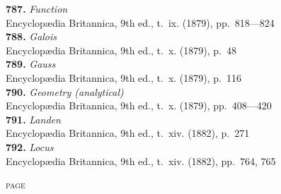 \documentclass[12pt,a4paper,oneside]{book}
\begin{document}
\textbf{787.} \textit{Function} \\
\hspace*{2em}Encyclop\ae{}dia Britannica, 9th ed., t.~ix. (1879), pp.~818---824\\[0.4em]
\textbf{788.} \textit{Galois} \\
\hspace*{2em}Encyclop\ae{}dia Britannica, 9th ed., t.~x. (1879), p.~48\\[0.4em]
\textbf{789.} \textit{Gauss} \\
\hspace*{2em}Encyclop\ae{}dia Britannica, 9th ed., t.~x. (1879), p.~116\\[0.4em]
\textbf{790.} \textit{Geometry (analytical)} \\
\hspace*{2em}Encyclop\ae{}dia Britannica, 9th ed., t.~x. (1879), pp.~408---420\\[0.4em]
\textbf{791.} \textit{Landen} \\
\hspace*{2em}Encyclop\ae{}dia Britannica, 9th ed., t.~xiv. (1882), p.~271\\[0.4em]
\textbf{792.} \textit{Locus} \\
\hspace*{2em}Encyclop\ae{}dia Britannica, 9th ed., t.~xiv. (1882), pp.~764, 765

\clearpage

\vspace*{1em}

\hfill\textsc{page}
\end{document}

